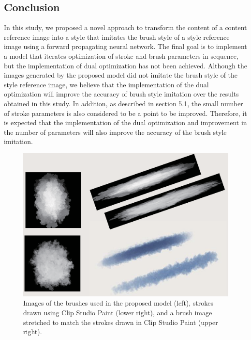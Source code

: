 \documentclass{mva_style}
\begin{document}
\subsection{Conclusion}
In this study, we proposed a novel approach to transform the content of a 
content reference image into a style that imitates the brush style of a style 
reference image using a forward propagating neural network. The final goal 
is to implement a model that iterates optimization of stroke and brush 
parameters in sequence, but the implementation of dual optimization has not 
been achieved. Although the images generated by the proposed model did not 
imitate the brush style of the style reference image, we believe that the 
implementation of the dual optimization will improve the accuracy of brush 
style imitation over the results obtained in this study.
In addition, as described in section 5.1, the small number of stroke parameters 
is also considered to be a point to be improved. Therefore, it is expected 
that the implementation of the dual optimization and improvement in the number 
of parameters will also improve the accuracy of the brush style imitation.

\begin{figure}[t]
  \centering
  \includegraphics[width=1.0\linewidth]{resource/brush_discussion.eps}
  \caption{Images of the brushes used in the proposed model (left), 
  strokes drawn using Clip Studio Paint (lower right), 
  and a brush image stretched to match the strokes drawn in Clip Studio Paint (upper right).}
  \label{fig:discussion}
\end{figure}
\end{document}

